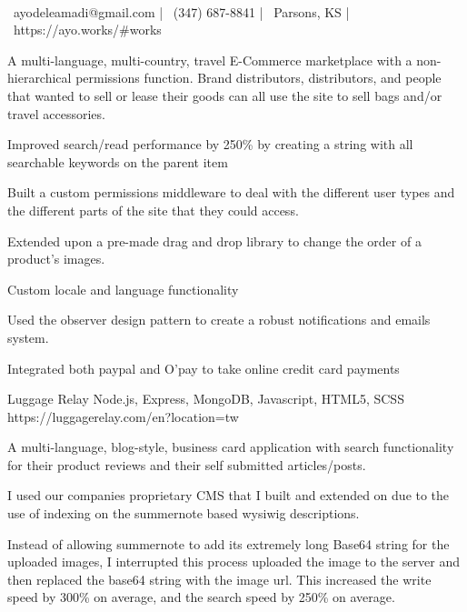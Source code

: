 \documentclass[]{awesome-cv}
\begin{document}
    
\begin{center}
	  \\
	\vspace{2mm}
	{\faEnvelope\ ayodeleamadi@gmail.com} | {\faMobile\ (347) 687-8841} | {\faMapMarker\ Parsons, KS} | {\faLink\ https://ayo.works/\#works}
\end{center}
\begin{cventries}
	\cventry
	{{A multi-language, multi-country, travel E-Commerce marketplace with a  non-hierarchical permissions function. Brand distributors, distributors, and people that wanted to sell or lease their goods can all use the site to sell bags and/or travel accessories.}
	    \vspace{5mm}
		{\begin{cvitems}
    	\item {Improved search/read performance by 250\% by creating a string with all searchable keywords on the parent item}
    	\item {Built a custom permissions middleware to deal with the different user types and the different parts of the site that they could access.}
    	\item {Extended upon a pre-made drag and drop library to change the order of a product's images.}
    	\item {Custom locale and language functionality}
    	\item {Used the observer design pattern to create a robust notifications and emails system.}
    	\item {Integrated both paypal and O'pay to take online credit card payments }
	    \end{cvitems}}\vspace{-7mm}}
	{Luggage Relay}
	{Node.js, Express, MongoDB, Javascript, HTML5, SCSS}
	{https://luggagerelay.com/en?location=tw}
	{}
	\cventry
	{{A multi-language, blog-style, business card application with search functionality for their product reviews and their self submitted articles/posts.}
	    \vspace{5mm}
		{\begin{cvitems}
    	\item { I used our companies proprietary CMS that I built and extended on due to the use of indexing on the summernote based wysiwig descriptions. }
    	\item {Instead of allowing summernote to add it\textquotesingle{}s extremely long Base64 string for the uploaded images, I interrupted this process uploaded the image to the server and then replaced the base64 string with the image url. This increased the write speed by 300\% on average, and the search speed by 250\% on average.}

\end{cvitems}}}
\end{cventries}
\end{document}
